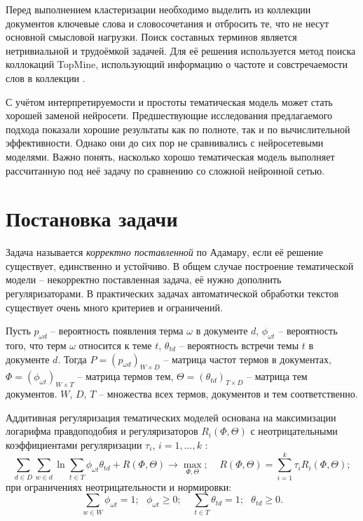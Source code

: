 \documentclass[a4paper, 12pt]{article}
\begin{document}
        Перед выполнением кластеризации необходимо выделить из коллекции документов ключевые слова и словосочетания и отбросить те, что не несут основной смысловой нагрузки. Поиск составных терминов является нетривиальной и трудоёмкой задачей. Для её решения используется метод поиска коллокаций TopMine, использующий информацию о частоте и совстречаемости слов в коллекции \citep{shatalov2019}.


        С учётом интерпретируемости и простоты тематическая модель может стать хорошей заменой нейросети. Предшествующие исследования предлагаемого подхода показали хорошие результаты как по полноте, так и по вычислительной эффективности. Однако они до сих пор не сравнивались с нейросетевыми моделями. Важно понять, насколько хорошо тематическая модель выполняет рассчитанную под неё задачу по сравнению со сложной нейронной сетью.

\section{Постановка задачи}
        Задача называется \textit{корректно поставленной} по Адамару, если её решение существует, единственно и устойчиво. В общем случае построение тематической модели -- некорректно поставленная задача, её нужно дополнить регуляризаторами. В практических задачах автоматической обработки текстов существует очень много критериев и ограничений.

        Пусть $p_{\omega d}$ -- вероятность появления терма $\omega$ в документе $d$, $\phi_{\omega t}$ -- вероятность того, что терм $\omega$ относится к теме $t$, $\theta_{td}$ -- вероятность встречи темы $t$ в документе $d$. Тогда $P = (p_{\omega d})_{W \times D}$ -- матрица частот термов в документах, $\Phi = (\phi_{\omega t})_{W \times T}$ -- матрица термов тем, $\Theta = (\theta_{td})_{T \times D}$ -- матрица тем документов. $W$, $D$, $T$ -- множества всех термов, документов и тем соответственно.
       
        Аддитивная регуляризация тематических моделей основана на максимизации логарифма правдоподобия и регуляризаторов $R_i(\Phi, \Theta)$ с неотрицательными коэффициентами регуляризации $\tau_i$, $i = 1, ..., k$ \citep{vorontsov2020}:
        \begin{equation}
            \sum\limits_{d \in D}\sum\limits_{w \in d}\ln\sum\limits_{t \in T}\phi_{\omega t}\theta_{td} + R(\Phi, \Theta) \to \max\limits_{\Phi, \Theta}; ~~~~~ R(\Phi, \Theta) = \sum\limits_{i = 1}^k\tau_iR_i(\Phi, \Theta);
        \end{equation}
        при ограничениях неотрицательности и нормировки:
        \begin{equation}
            \sum\limits_{w \in W}\phi_{\omega t} = 1; ~~~ \phi_{\omega t} \geq 0; ~~~~~ \sum\limits_{t \in T}\theta_{td} = 1; ~~~ \theta_{td} \geq 0.
        \end{equation}
\end{document}

